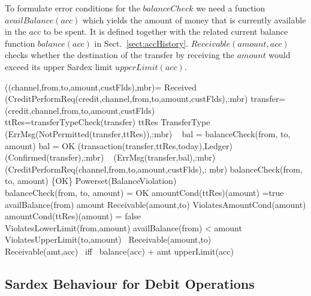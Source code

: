 To formulate error conditions for the $balanceCheck$ we need a function $availBalance(acc)$ which yields the amount of money that is currently available in the $acc$ to be spent. It is defined together with the related current balance function $balance(acc)$ in Sect.~\ref{sect:accHistory}. $Receivable(amount,acc)$ checks whether the destination of the transfer by receiving the $amount$ would exceed its upper Sardex limit $upperLimit(acc)$.


\begin{asm}
((channel,from,to,amount,custFlds),mbr)=\+
\IF Received
   (CreditPerformReq(credit,channel,from,to,amount,custFlds),\FROM :mbr) \THEN \+  \LET transfer=(credit,channel,from,to,amount,custFlds) \\
    \LET ttRes=transferTypeCheck(transfer)  \+
      \IF ttRes \not \in TransferType \THEN \+ (ErrMsg(NotPermitted(transfer,ttRes)),\TO :mbr)\-
       \ELSE~ 
       \LET bal = balanceCheck(from, to, amount) \+
              \IF bal = OK \+
                 \THEN \+
                      (transaction(transfer,ttRes,today),Ledger)\\
                      (Confirmed(transfer),\TO :mbr)\-
                \ELSE ~ (ErrMsg(transfer,bal),\TO :mbr)\dec\dec\-
    (CreditPerformReq(channel,from,to,amount,custFlds),\FROM : mbr) \dec\-
\WHERE \+
balanceCheck(from, to, amount) \in \{OK\} 
                  \cup Powerset(BalanceViolation)\\
balanceCheck(from, to, amount) = OK \IFF 
         amountCond(ttRes)(amount) =true \AND \+
         availBalance(from) \geq amount  \AND Receivable(amount,to)\-
ViolatesAmountCond(amount) \IF  amountCond(ttRes)(amount) = false \\
ViolatesLowerLimit(from,amount) \IF availBalance(from) < amount \\
ViolatesUpperLimit(to,amount) \IF ~\NOT Receivable(amount,to) \\
 Receivable(amt,acc) \mbox{ iff } balance(acc) + amt \leq upperLimit(acc)
\end{asm}



\subsection{Sardex Behaviour for Debit Operations}
\label{sec:debitop}

